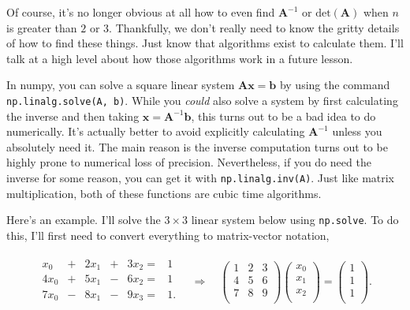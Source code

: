 \documentclass[
  letterpaper,
  DIV=11,
  numbers=noendperiod]{scrreprt}
\begin{document}
Of course, it's no longer obvious at all how to even find
\(\mathbf{A}^{-1}\) or \(\text{det}(\mathbf{A})\) when \(n\) is greater
than \(2\) or \(3\). Thankfully, we don't really need to know the gritty
details of how to find these things. Just know that algorithms exist to
calculate them. I'll talk at a high level about how those algorithms
work in a future lesson.

In numpy, you can solve a square linear system
\(\mathbf{A}\mathbf{x} = \mathbf{b}\) by using the command
\texttt{np.linalg.solve(A,\ b)}. While you \emph{could} also solve a
system by first calculating the inverse and then taking
\(\mathbf{x} = \mathbf{A}^{-1} \mathbf{b}\), this turns out to be a bad
idea to do numerically. It's actually better to avoid explicitly
calculating \(\mathbf{A}^{-1}\) unless you absolutely need it. The main
reason is the inverse computation turns out to be highly prone to
numerical loss of precision. Nevertheless, if you do need the inverse
for some reason, you can get it with \texttt{np.linalg.inv(A)}. Just
like matrix multiplication, both of these functions are cubic time
algorithms.

Here's an example. I'll solve the \(3 \times 3\) linear system below
using \texttt{np.solve}. To do this, I'll first need to convert
everything to matrix-vector notation,

\begin{gather*}
\begin{alignedat}{5}
   x_0 & {}+{} &  2x_1 & {}+{} & 3x_2 {}={} & 1 \\
   4x_0 & {}+{} &  5x_1 & {}-{} & 6x_2 {}={} & 1 \\
   7x_0 & {}-{} &  8x_1 & {}-{} & 9x_3 {}={} & 1. \\
\end{alignedat}
\quad \Longrightarrow \quad
\begin{pmatrix}
1 & 2 & 3 \\
4 & 5 & 6 \\
7 & 8 & 9 \\
\end{pmatrix}
\begin{pmatrix}
x_0 \\
x_1 \\
x_2 \\
\end{pmatrix} = 
\begin{pmatrix}
1 \\
1 \\
1 \\
\end{pmatrix}.
\end{gather*}
\end{document}
